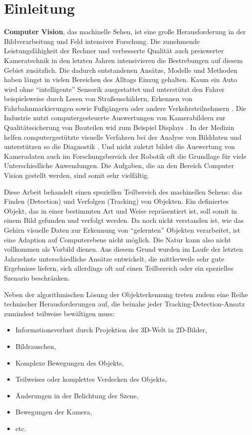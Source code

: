 \section{Einleitung}
\textbf{Computer Vision}, das machinelle Sehen, ist eine große Herausforderung in der Bildverarbeitung und Feld intensiver Forschung. Die zunehmende Leistungsfähigkeit der Rechner und verbesserte Qualität auch preiswerter Kameratechnik in den letzten Jahren intensivieren die Bestrebungen auf diesem Gebiet zusätzlich. Die dadurch entstandenen Ansätze, Modelle und Methoden haben längst in vielen Bereichen des Alltags Einzug gehalten. Kaum ein Auto wird ohne ``intelligente'' Sensorik ausgestattet und unterstützt den Fahrer beispielsweise durch Lesen von Straßenschildern, Erkennen von Fahrbahnmarkierungen sowie Fußgängern oder andere Verkehrsteilnehmern \cite{PED}. Die Industrie nutzt computergesteuerte Auswertungen von Kamerabildern zur Qualitätssicherung von Bauteilen wid zum Beispiel Displays \cite{LCD}. In der Medizin helfen computergestützte visuelle Verfahren bei der Analyse von Bilddaten und unterstützen so die Diagnostik \cite{MIP}. Und nicht zuletzt bildet die Auswertung von Kameradaten auch im Forschungsbereich der Robotik oft die Grundlage für viele Unterschiedliche Anwendungen. Die Aufgaben, die an den Bereich Computer Vision gestellt werden, sind somit sehr vielfältig.

Diese Arbeit behandelt einen speziellen Teilbereich des machinellen Sehens: das Finden (Detection) und Verfolgen (Tracking) von Objekten. Ein definiertes Objekt, das in einer bestimmten Art und Weise repräsentiert ist, soll somit in einem Bild gefunden und verfolgt werden. Da noch nicht verstanden ist, wie das Gehirn visuelle Daten zur Erkennung von ``gelernten'' Objekten verarbeitet, ist eine Adaption auf Computerebene nicht möglich. Die Natur kann also nicht vollkommen als Vorbild dienen. Aus diesem Grund wurden im Laufe der letzten Jahrzehnte unterschiedliche Ansätze entwickelt, die mittlerweile sehr gute Ergebnisse liefern, sich allerdings oft auf einen Teilbereich oder ein spezielles Szenario beschränken.

Neben der algorithmischen Lösung der Objekterkennung treten zudem eine Reihe technischer Herausforderungen auf, die beinahe jeder Tracking-Detection-Ansatz zumindest teilweise bewältigen muss:

\begin{itemize}
\item Informationsverlust durch Projektion der 3D-Welt in 2D-Bilder,
\item Bildrauschen,
\item Komplexe Bewegungen des Objekts,
\item Teilweises oder komplettes Verdecken des Objekts,
\item Änderungen in der Belichtung der Szene,
\item Bewegungen der Kamera,
\item etc.
\end{itemize}

